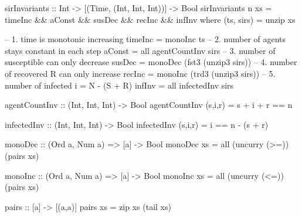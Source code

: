 \begin{HaskellCode}
sirInvariants :: Int -> [(Time, (Int, Int, Int))] -> Bool
sirInvariants n xs = timeInc && aConst && susDec && recInc && infInv
  where
    (ts, sirs) = unzip xs

    -- 1. time is monotonic increasing
    timeInc = monoInc ts
    -- 2. number of agents stays constant in each step
    aConst = all agentCountInv sirs
    -- 3. number of susceptible can only decrease
    susDec = monoDec (fst3 (unzip3 sirs))
    -- 4. number of recovered R can only increase
    recInc = monoInc (trd3 (unzip3 sirs))
    -- 5. number of infected i = N - (S + R)
    infInv = all infectedInv sirs

    agentCountInv :: (Int, Int, Int) -> Bool
    agentCountInv (s,i,r) = s + i + r == n

    infectedInv :: (Int, Int, Int) -> Bool
    infectedInv (s,i,r) = i == n - (s + r)

    monoDec :: (Ord a, Num a) => [a] -> Bool
    monoDec xs = all (uncurry (>=)) (pairs xs)

    monoInc :: (Ord a, Num a) => [a] -> Bool
    monoInc xs = all (uncurry (<=)) (pairs xs)

    pairs :: [a] -> [(a,a)]
    pairs xs = zip xs (tail xs)
\end{HaskellCode}